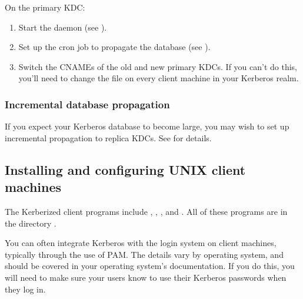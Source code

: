\documentclass[letterpaper,10pt,english]{sphinxmanual}
\begin{document}
On the  primary KDC:
\begin{enumerate}
\item {} 
Start the {\hyperref[\detokenize{admin/admin_commands/kadmind:kadmind-8}]{}} daemon (see {\hyperref[\detokenize{admin/install_kdc:start-kdc-daemons}]{}}).

\item {} 
Set up the cron job to propagate the database (see
{\hyperref[\detokenize{admin/install_kdc:kprop-to-replicas}]{}}).

\item {} 
Switch the CNAMEs of the old and new primary KDCs.  If you can’t do
this, you’ll need to change the {\hyperref[\detokenize{admin/conf_files/krb5_conf:krb5-conf-5}]{}} file on every
client machine in your Kerberos realm.

\end{enumerate}


\subsubsection{Incremental database propagation}
\label{\detokenize{admin/install_kdc:incremental-database-propagation}}
If you expect your Kerberos database to become large, you may wish to
set up incremental propagation to replica KDCs.  See
{\hyperref[\detokenize{admin/database:incr-db-prop}]{}} for details.


\subsection{Installing and configuring UNIX client machines}
\label{\detokenize{admin/install_clients:installing-and-configuring-unix-client-machines}}\label{\detokenize{admin/install_clients::doc}}
The Kerberized client programs include ,
, , and .  All of
these programs are in the directory {\hyperref[\detokenize{mitK5defaults:paths}]{}}.

You can often integrate Kerberos with the login system on client
machines, typically through the use of PAM.  The details vary by
operating system, and should be covered in your operating system’s
documentation.  If you do this, you will need to make sure your users
know to use their Kerberos passwords when they log in.
\end{document}
